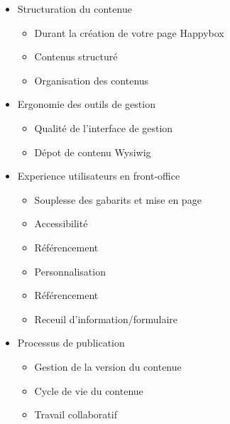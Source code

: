 \documentclass[11pt, a4paper ]{report}
\begin{document}
\begin{itemize}
	\item Structuration du contenue 

		\begin{itemize}
			\item Durant la création de votre page Happybox 

			\item Contenus structuré 

			\item Organisation des contenus 

		\end{itemize}

	\item Ergonomie des outils de gestion 

		\begin{itemize}
			\item Qualité de l'interface de gestion 

			\item Dépot de contenu Wysiwig 

		\end{itemize}

	\item Experience utilisateurs en front-office 
		\begin{itemize}
			\item Souplesse des gabarits et mise en page 

			\item Accessibilité 

			\item Référencement 

			\item Personnalisation 

			\item Référencement 
			\item Receuil d'information/formulaire 

		\end{itemize}

	\item Processus de publication 
		\begin{itemize}
			\item Gestion de la version du contenue 

			\item Cycle de vie du contenue 

			\item Travail collaboratif 

		\end{itemize}


\end{itemize}
\end{document}
